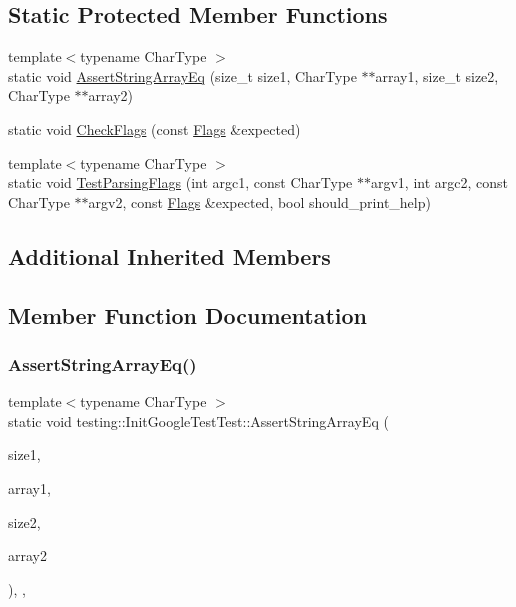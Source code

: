 \subsection*{Static Protected Member Functions}
\begin{DoxyCompactItemize}
\item 
{\footnotesize template$<$typename Char\+Type $>$ }\\static void \hyperlink{classtesting_1_1_init_google_test_test_af32acd91b1185c6868072009dce55a7b}{Assert\+String\+Array\+Eq} (size\+\_\+t size1, Char\+Type $\ast$$\ast$array1, size\+\_\+t size2, Char\+Type $\ast$$\ast$array2)
\item 
static void \hyperlink{classtesting_1_1_init_google_test_test_aac37d5d592202bf6614b02fe0b4da9d2}{Check\+Flags} (const \hyperlink{structtesting_1_1_flags}{Flags} \&expected)
\item 
{\footnotesize template$<$typename Char\+Type $>$ }\\static void \hyperlink{classtesting_1_1_init_google_test_test_add290338cf429308d0ab275ae4c46e69}{Test\+Parsing\+Flags} (int argc1, const Char\+Type $\ast$$\ast$argv1, int argc2, const Char\+Type $\ast$$\ast$argv2, const \hyperlink{structtesting_1_1_flags}{Flags} \&expected, bool should\+\_\+print\+\_\+help)
\end{DoxyCompactItemize}
\subsection*{Additional Inherited Members}


\subsection{Member Function Documentation}
\mbox{\label{classtesting_1_1_init_google_test_test_af32acd91b1185c6868072009dce55a7b}} 
\subsubsection{\texorpdfstring{Assert\+String\+Array\+Eq()}{AssertStringArrayEq()}}
{\footnotesize\ttfamily template$<$typename Char\+Type $>$ \\
static void testing\+::\+Init\+Google\+Test\+Test\+::\+Assert\+String\+Array\+Eq (\begin{DoxyParamCaption}\item[{size\+\_\+t}]{size1,  }\item[{Char\+Type $\ast$$\ast$}]{array1,  }\item[{size\+\_\+t}]{size2,  }\item[{Char\+Type $\ast$$\ast$}]{array2 }\end{DoxyParamCaption})\hspace{0.3cm}{\ttfamily [inline]}, {\ttfamily [static]}, {\ttfamily [protected]}}

